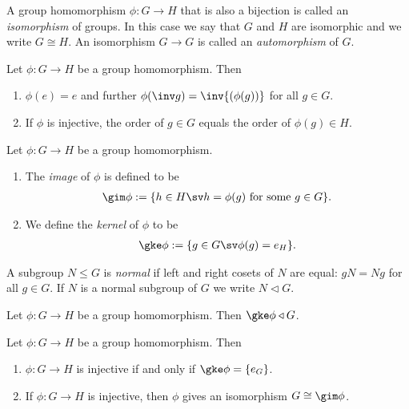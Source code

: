 \documentclass{article}
\begin{document}
\begin{definition}
    A group homomorphism $\phi:G\to H$ that is also a bijection is
    called an \emph{isomorphism} of groups. In this case we say that
    $G$ and $H$ are isomorphic and we write $G\cong H$. An
    isomorphism $G\to G$ is called an \emph{automorphism} of $G$.
\end{definition}

\setcounter{theorem}{4}
\begin{lemma}
    Let $\phi:G\to H$ be a group homomorphism. Then
    \begin{enumerate}
        \item $\phi(e)=e$ and further $\phi(\inv g)=\inv{(\phi(g))}$ for all $g\in G$.
        \item If $\phi$ is injective, the order of $g\in G$ equals the order of $\phi(g)\in H$.
    \end{enumerate}
\end{lemma}

\begin{definition}
    Let $\phi:G\to H$ be a group homomorphism.
    \begin{enumerate}
        \item The \emph{image} of $\phi$ is defined to be \begin{align*}
                  \gim\phi := \{h\in H \sv h=\phi(g)\text{ for some }g\in G\}.
              \end{align*}
        \item We define the \emph{kernel} of $\phi$ to be \begin{align*}
                  \gke \phi := \{g\in G \sv \phi(g) = e_H\}.
              \end{align*}
    \end{enumerate}
\end{definition}

\begin{definition}
    A subgroup $N\leq G$ is \emph{normal} if left and right cosets
    of $N$ are equal: $gN=Ng$ for all $g\in G$. If $N$ is a normal
    subgroup of $G$ we write $N \triangleleft G$.
\end{definition}


\begin{proposition}
    Let $\phi:G\to H$ be a group homomorphism. Then $\gke\phi\triangleleft G$.
\end{proposition}

\begin{proposition}
    Let $\phi: G\to H$ be a group homomorphism. Then
    \begin{enumerate}
        \item $\phi:G\to H$ is injective if and only if $\gke\phi=\{e_G\}$.
        \item If $\phi:G\to H$ is injective, then $\phi$ gives an isomorphism $G\cong \gim\phi$.
    \end{enumerate}
\end{proposition}
\end{document}
